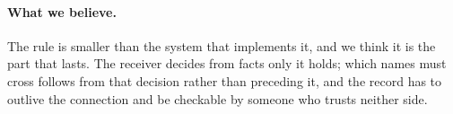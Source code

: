 \paragraph{What we believe.}
The rule is smaller than the system that implements it, and we think it is the
part that lasts. The receiver decides from facts only it holds; which names must
cross follows from that decision rather than preceding it, and the record has to
outlive the connection and be checkable by someone who trusts neither side.
